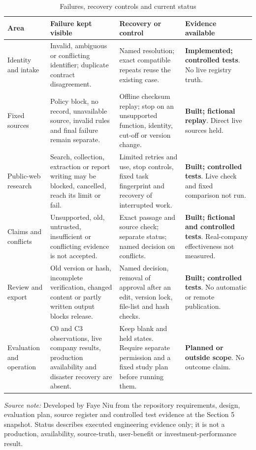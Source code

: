 \clearpage
\begin{table}[p]
  \centering
  \scriptsize
  \setlength{\tabcolsep}{3pt}
  \renewcommand{\arraystretch}{1.08}
  \begin{tabularx}{\textwidth}{@{}P{0.18\textwidth}P{0.24\textwidth}P{0.24\textwidth}Y@{}}
    \toprule
    \textbf{Area} & \textbf{Failure kept visible} & \textbf{Recovery or control} & \textbf{Evidence available} \\
    \midrule
    Identity and intake & Invalid, ambiguous or conflicting identifier; duplicate contract disagreement. & Named resolution; exact compatible repeats reuse the existing case. & \textbf{Implemented; controlled tests}. No live registry truth. \\
    \addlinespace
    Fixed sources & Policy block, no record, unavailable source, invalid rules and final failure remain separate. & Offline checksum replay; stop on an unsupported function, identity, cut-off or version change. & \textbf{Built; fictional replay}. Direct live sources held. \\
    \addlinespace
    Public-web research & Search, collection, extraction or report writing may be blocked, cancelled, reach its limit or fail. & Limited retries and use, stop controls, fixed task fingerprint and recovery of interrupted work. & \textbf{Built; controlled tests}. Live check and fixed comparison not run. \\
    \addlinespace
    Claims and conflicts & Unsupported, old, untrusted, insufficient or conflicting evidence is not accepted. & Exact passage and source check; separate status; named decision on conflicts. & \textbf{Built; fictional and controlled tests}. Real-company effectiveness not measured. \\
    \addlinespace
    Review and export & Old version or hash, incomplete verification, changed content or partly written output blocks release. & Named decision, removal of approval after an edit, version lock, file-list and hash checks. & \textbf{Built; controlled tests}. No automatic or remote publication. \\
    \addlinespace
    Evaluation and operation & C0 and C3 observations, live company results, production availability and disaster recovery are absent. & Keep blank and held states. Require separate permission and a fixed study plan before running them. & \textbf{Planned or outside scope}. No outcome claim. \\
    \bottomrule
  \end{tabularx}

  \caption{Failures, recovery controls and current status}
  \label{tab:sys-failure-recovery-status}

  \vspace{4pt}
  \parbox{\textwidth}{\scriptsize
    \textit{Source note:} Developed by Faye Niu from the repository requirements, design,
    evaluation plan, source register and controlled test evidence at the Section 5
    snapshot. Status describes executed engineering evidence only; it is not a production,
    availability, source-truth, user-benefit or investment-performance result.}
\end{table}
\clearpage
